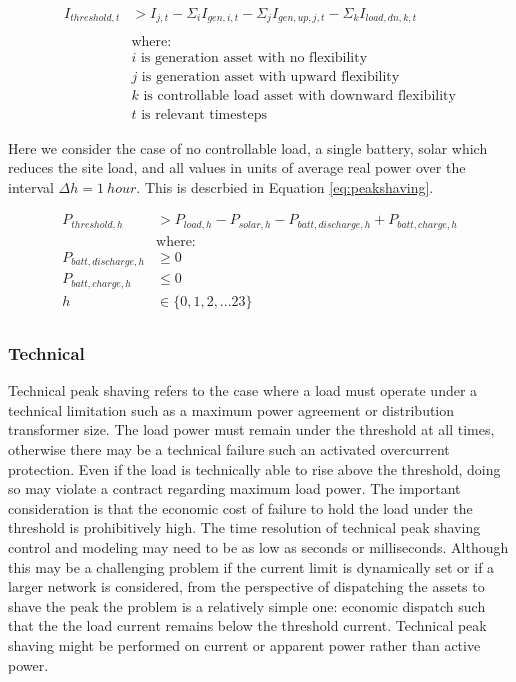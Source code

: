 \documentclass[
]{article}
\begin{document}
\begin{equation}
  \label{eg:peakshaving-general}
  \begin{split}
    I_{threshold,t} &> I_{j,t} - \Sigma_i I_{gen,i,t} - \Sigma_j I_{gen,up,j,t} - \Sigma_k I_{load,dn,k,t}  \\
    \\
    &\text{where:} \\
    &i\text{ is generation asset with no flexibility} \\
    &j\text{ is generation asset with upward flexibility} \\
    &k\text{ is controllable load asset with downward flexibility} \\
    &t\text{ is relevant timesteps}
  \end{split}
\end{equation}

Here we consider the case of no controllable load, a single battery,
solar which reduces the site load, and all values in units of average
real power over the interval \(\Delta h = 1\ hour\). This is descrbied in Equation \ref{eq:peakshaving}.

\begin{equation}
  \label{eq:peakshaving}
  \begin{split}
    P_{threshold,h} &> P_{load,h} - P_{solar,h} - P_{batt,discharge,h} + P_{batt,charge,h}   \\
    &\text{where:} \\
    P_{batt,discharge,h} &\ge 0 \\
    P_{batt,charge,h} &\le 0 \\
    h &\in \{0,1,2,...23\} \\
  \end{split}
\end{equation}

\hypertarget{technical}{%
  \subsubsection{Technical}\label{technical}}

Technical peak shaving refers to the case where a load must operate
under a technical limitation such as a maximum power agreement or
distribution transformer size. The load power must remain under the
threshold at all times, otherwise there may be a technical failure such
an activated overcurrent protection. Even if the load is technically
able to rise above the threshold, doing so may violate a contract
regarding maximum load power. The important consideration is that the
economic cost of failure to hold the load under the threshold is
prohibitively high. The time resolution of technical peak shaving
control and modeling may need to be as low as seconds or milliseconds.
Although this may be a challenging problem if the current limit is
dynamically set or if a larger network is considered, from the
perspective of dispatching the assets to shave the peak the problem is a
relatively simple one: economic dispatch such that the the load current
remains below the threshold current. Technical peak shaving might be
performed on current or apparent power rather than active power.
\end{document}
